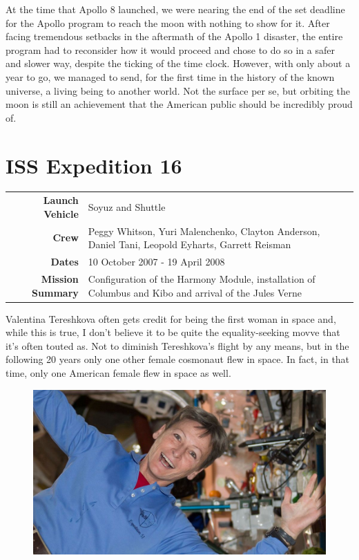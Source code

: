 \documentclass{article}
\begin{document}
  At the time that Apollo 8 launched, we were nearing the end of the set deadline
  for the Apollo program to reach the moon with nothing to show for it. After
  facing tremendous setbacks in the aftermath of the Apollo 1 disaster, the entire
  program had to reconsider how it would proceed and chose to do so in a safer and
  slower way, despite the ticking of the time clock. However, with only about a
  year to go, we managed to send, for the first time in the history of the known
  universe, a living being to another world. Not the surface per se, but orbiting
  the moon is still an achievement that the American public should be incredibly
  proud of.

  \section{ISS Expedition 16}

  \begin{center}
    \begin{tabular}{ >{\bfseries}r | p{3.5in} }
      \hline
      Launch Vehicle & Soyuz and Shuttle \\
      Crew & Peggy Whitson, 
             Yuri Malenchenko, 
             Clayton Anderson, 
             Daniel Tani,
             Leopold Eyharts, 
             Garrett Reisman \\
      Dates & 10 October 2007 - 19 April 2008 \\
      Mission Summary & Configuration of the Harmony Module, installation of
      Columbus and Kibo and arrival of the Jules Verne \\
      \hline
    \end{tabular}
  \end{center}

  Valentina Tereshkova often gets credit for being the first woman in space and,
  while this is true, I don't believe it to be quite the equality-seeking movve
  that it's often touted as. Not to diminish Tereshkova's flight by any means, but
  in the following 20 years only one other female cosmonaut flew in space.
  In fact, in that time, only one American female flew in
  space as well. 
 
  \begin{figure}
    \includegraphics[width=0.9\linewidth]{whitson.jpg}
  \end{figure}
\end{document}
